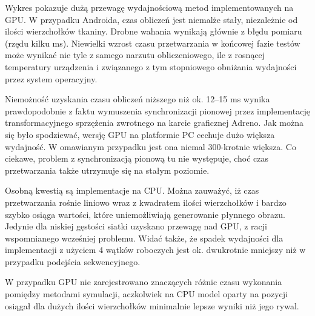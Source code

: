 		Wykres pokazuje dużą przewagę wydajnościową metod implementowanych na GPU. W przypadku Androida, czas obliczeń jest niemalże stały, niezależnie od ilości wierzchołków tkaniny. Drobne wahania wynikają głównie z błędu pomiaru (rzędu kilku ms). Niewielki wzrost czasu przetwarzania w końcowej fazie testów może wynikać nie tyle z samego narzutu obliczeniowego, ile z rosnącej temperatury urządzenia i związanego z tym stopniowego obniżania wydajności przez system operacyjny. 
		
		Niemożność uzyskania czasu obliczeń niższego niż ok. 12--15 ms wynika prawdopodobnie z faktu wymuszenia synchronizacji pionowej przez implementację transformacyjnego sprzężenia zwrotnego na karcie graficznej Adreno. Jak można się było spodziewać, wersję GPU na platformie PC cechuje dużo większa wydajność. W omawianym przypadku jest ona niemal 300-krotnie większa. Co ciekawe, problem z synchronizacją pionową tu nie występuje, choć czas przetwarzania także utrzymuje się na stałym poziomie. 
		
		Osobną kwestią są implementacje na CPU. Można zauważyć, iż czas przetwarzania rośnie liniowo wraz z kwadratem ilości wierzchołków i bardzo szybko osiąga wartości, które uniemożliwiają generowanie płynnego obrazu. Jedynie dla niskiej gęstości siatki uzyskano przewagę nad GPU, z racji wspomnianego wcześniej problemu. Widać także, że spadek wydajności dla implementacji z użyciem 4 wątków roboczych jest ok. dwukrotnie mniejszy niż w przypadku podejścia sekwencyjnego.
		
		W przypadku GPU nie zarejestrowano znaczących różnic czasu wykonania pomiędzy metodami symulacji, aczkolwiek na CPU model oparty na pozycji osiągał dla dużych ilości wierzchołków minimalnie lepsze wyniki niż jego rywal.
		
		
		
		
		
		
